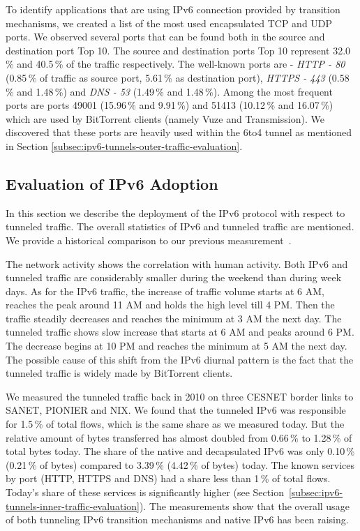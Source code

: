 To identify applications that are using IPv6 connection provided by transition mechanisms, we created a list of the most used encapsulated TCP and UDP ports. We observed several ports that can be found both in the source and destination port Top 10. The source and destination ports Top 10 represent 32.0\,\% and 40.5\,\% of the traffic respectively. The well-known ports are - \emph{HTTP - 80} (0.85\,\% of traffic as source port, 5.61\,\% as destination port), \emph{HTTPS - 443} (0.58\,\% and 1.48\,\%) and \emph{DNS - 53} (1.49\,\% and 1.48\,\%). Among the most frequent ports are ports 49001 (15.96\,\% and 9.91\,\%) and 51413 (10.12\,\% and 16.07\,\%) which are used by BitTorrent clients (namely Vuze
and Transmission). We discovered that these ports are heavily used within the 6to4 tunnel as mentioned in Section \ref{subsec:ipv6-tunnels-outer-traffic-evaluation}.

\subsection{Evaluation of IPv6 Adoption} \label{subsec:ipv6-tunnels-evaluation-of-ipv6}

In this section we describe the deployment of the IPv6 protocol with respect to tunneled traffic. The overall statistics of IPv6 and tunneled traffic are mentioned. We provide a historical comparison to our previous measurement~\cite{Elich-2011-Monitoring}. 

The network activity shows the correlation with human activity. Both IPv6 and tunneled traffic are considerably smaller during the weekend than during week days. As for the IPv6 traffic, the increase of traffic volume starts at 6 AM, reaches the peak around 11 AM and holds the high level till 4 PM. Then the traffic steadily decreases and reaches the minimum at 3 AM the next day. The tunneled traffic shows slow increase that starts at 6 AM and peaks around 6 PM. The decrease begins at 10 PM and reaches the minimum at 5 AM the next day. The possible cause of this shift from the IPv6 diurnal pattern is the fact that the tunneled traffic is widely made by BitTorrent clients.

We measured the tunneled traffic back in 2010 on three CESNET border links to SANET, PIONIER and NIX. We found that the tunneled IPv6 was responsible for 1.5\,\% of total flows, which is the same share as we measured today. But the relative amount of bytes transferred has almost doubled from 0.66\,\% to 1.28\,\% of total bytes today. The share of the native and decapsulated IPv6 was only 0.10\,\% (0.21\,\% of bytes) compared to 3.39\,\% (4.42\,\% of bytes) today. The known services by port (HTTP, HTTPS and DNS) had a share less than 1\,\% of total flows. Today's share of these services is significantly higher (see Section~\ref{subsec:ipv6-tunnels-inner-traffic-evaluation}). The measurements show that the overall usage of both tunneling IPv6 transition mechanisms and native IPv6 has been raising.

